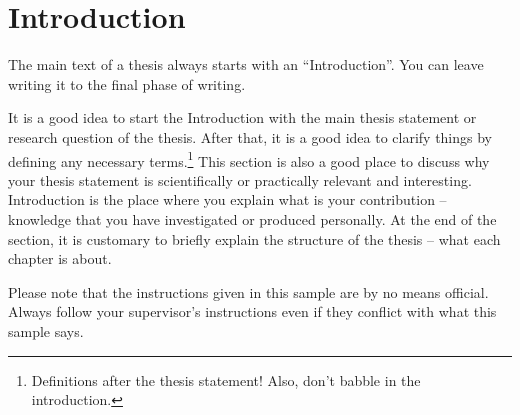 \section*{Introduction}

The main text of a thesis always starts with an ``Introduction''.
You can leave writing it to the final phase of writing.

It is a good idea to start the Introduction with the main thesis
statement or research question of the thesis.  After that, it is a
good idea to clarify things by defining any necessary
terms.\footnote{Definitions after the thesis statement!  Also, don't
  babble in the introduction.}  This section is also a good place
to discuss why your thesis statement is scientifically or practically
relevant and interesting. Introduction is the place where you explain what is 
your contribution -- knowledge that you have investigated or produced 
personally. At the end of the section, it is customary to briefly
explain the structure of the thesis -- what each chapter is about.

Please note that the instructions given in this sample are by no means
official.  Always follow your supervisor's instructions even if they
conflict with what this sample says.